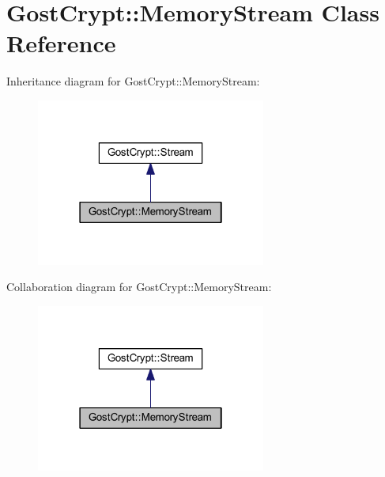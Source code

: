 \hypertarget{class_gost_crypt_1_1_memory_stream}{}\section{Gost\+Crypt\+:\+:Memory\+Stream Class Reference}
\label{class_gost_crypt_1_1_memory_stream}


Inheritance diagram for Gost\+Crypt\+:\+:Memory\+Stream\+:
\nopagebreak
\begin{figure}[H]
\begin{center}
\leavevmode
\includegraphics[width=214pt]{class_gost_crypt_1_1_memory_stream__inherit__graph}
\end{center}
\end{figure}


Collaboration diagram for Gost\+Crypt\+:\+:Memory\+Stream\+:
\nopagebreak
\begin{figure}[H]
\begin{center}
\leavevmode
\includegraphics[width=214pt]{class_gost_crypt_1_1_memory_stream__coll__graph}
\end{center}
\end{figure}
